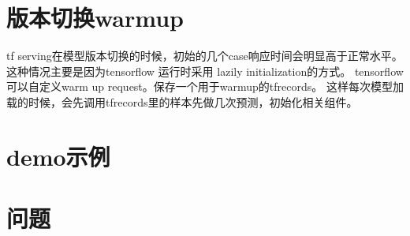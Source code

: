 \documentclass[12pt,a4paper,oneside]{article}
\begin{document}
\begin{CJK*}{UTF8}{gbsn}
\section{版本切换warmup}
tf serving在模型版本切换的时候，初始的几个case响应时间会明显高于正常水平。这种情况主要是因为tensorflow 运行时采用 lazily initialization的方式。 tensorflow可以自定义warm up request。保存一个用于warmup的tfrecords。 这样每次模型加载的时候，会先调用tfrecords里的样本先做几次预测，初始化相关组件。

\section{demo示例}

\section{问题}


\end{CJK*}
\end{document}
